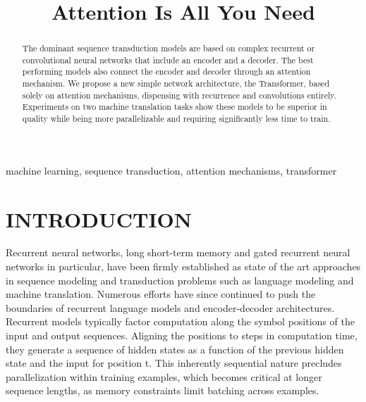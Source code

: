 \documentclass[conference]{IEEEtran}
\begin{document}
\title{Attention Is All You Need}

\author{
}

\maketitle

\begin{abstract}
The dominant sequence transduction models are based on complex recurrent or convolutional neural networks that include an encoder and a decoder. The best performing models also connect the encoder and decoder through an attention mechanism. We propose a new simple network architecture, the Transformer, based solely on attention mechanisms, dispensing with recurrence and convolutions entirely. Experiments on two machine translation tasks show these models to be superior in quality while being more parallelizable and requiring significantly less time to train.
\end{abstract}

\begin{IEEEkeywords}
machine learning, sequence transduction, attention mechanisms, transformer
\end{IEEEkeywords}

\section{INTRODUCTION}
Recurrent neural networks, long short-term memory and gated recurrent neural networks in particular, have been firmly established as state of the art approaches in sequence modeling and transduction problems such as language modeling and machine translation. Numerous efforts have since continued to push the boundaries of recurrent language models and encoder-decoder architectures. Recurrent models typically factor computation along the symbol positions of the input and output sequences. Aligning the positions to steps in computation time, they generate a sequence of hidden states as a function of the previous hidden state and the input for position t. This inherently sequential nature precludes parallelization within training examples, which becomes critical at longer sequence lengths, as memory constraints limit batching across examples.
\end{document}
